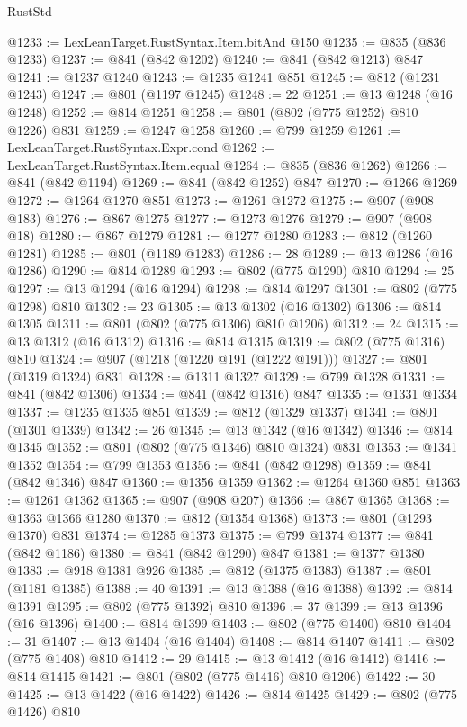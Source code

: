 \begin{lexlean}{RustStd}
\begin{coremodule}
@1233 := LexLeanTarget.RustSyntax.Item.bitAnd @150
@1235 := @835 (@836 @1233)
@1237 := @841 (@842 @1202)
@1240 := @841 (@842 @1213) @847
@1241 := @1237 @1240
@1243 := @1235 @1241 @851
@1245 := @812 (@1231 @1243)
@1247 := @801 (@1197 @1245)
@1248 := 22
@1251 := @13 @1248 (@16 @1248)
@1252 := @814 @1251
@1258 := @801 (@802 (@775 @1252) @810 @1226) @831
@1259 := @1247 @1258
@1260 := @799 @1259
@1261 := LexLeanTarget.RustSyntax.Expr.cond
@1262 := LexLeanTarget.RustSyntax.Item.equal
@1264 := @835 (@836 @1262)
@1266 := @841 (@842 @1194)
@1269 := @841 (@842 @1252) @847
@1270 := @1266 @1269
@1272 := @1264 @1270 @851
@1273 := @1261 @1272
@1275 := @907 (@908 @183)
@1276 := @867 @1275
@1277 := @1273 @1276
@1279 := @907 (@908 @18)
@1280 := @867 @1279
@1281 := @1277 @1280
@1283 := @812 (@1260 @1281)
@1285 := @801 (@1189 @1283)
@1286 := 28
@1289 := @13 @1286 (@16 @1286)
@1290 := @814 @1289
@1293 := @802 (@775 @1290) @810
@1294 := 25
@1297 := @13 @1294 (@16 @1294)
@1298 := @814 @1297
@1301 := @802 (@775 @1298) @810
@1302 := 23
@1305 := @13 @1302 (@16 @1302)
@1306 := @814 @1305
@1311 := @801 (@802 (@775 @1306) @810 @1206)
@1312 := 24
@1315 := @13 @1312 (@16 @1312)
@1316 := @814 @1315
@1319 := @802 (@775 @1316) @810
@1324 := @907 (@1218 (@1220 @191 (@1222 @191)))
@1327 := @801 (@1319 @1324) @831
@1328 := @1311 @1327
@1329 := @799 @1328
@1331 := @841 (@842 @1306)
@1334 := @841 (@842 @1316) @847
@1335 := @1331 @1334
@1337 := @1235 @1335 @851
@1339 := @812 (@1329 @1337)
@1341 := @801 (@1301 @1339)
@1342 := 26
@1345 := @13 @1342 (@16 @1342)
@1346 := @814 @1345
@1352 := @801 (@802 (@775 @1346) @810 @1324) @831
@1353 := @1341 @1352
@1354 := @799 @1353
@1356 := @841 (@842 @1298)
@1359 := @841 (@842 @1346) @847
@1360 := @1356 @1359
@1362 := @1264 @1360 @851
@1363 := @1261 @1362
@1365 := @907 (@908 @207)
@1366 := @867 @1365
@1368 := @1363 @1366 @1280
@1370 := @812 (@1354 @1368)
@1373 := @801 (@1293 @1370) @831
@1374 := @1285 @1373
@1375 := @799 @1374
@1377 := @841 (@842 @1186)
@1380 := @841 (@842 @1290) @847
@1381 := @1377 @1380
@1383 := @918 @1381 @926
@1385 := @812 (@1375 @1383)
@1387 := @801 (@1181 @1385)
@1388 := 40
@1391 := @13 @1388 (@16 @1388)
@1392 := @814 @1391
@1395 := @802 (@775 @1392) @810
@1396 := 37
@1399 := @13 @1396 (@16 @1396)
@1400 := @814 @1399
@1403 := @802 (@775 @1400) @810
@1404 := 31
@1407 := @13 @1404 (@16 @1404)
@1408 := @814 @1407
@1411 := @802 (@775 @1408) @810
@1412 := 29
@1415 := @13 @1412 (@16 @1412)
@1416 := @814 @1415
@1421 := @801 (@802 (@775 @1416) @810 @1206)
@1422 := 30
@1425 := @13 @1422 (@16 @1422)
@1426 := @814 @1425
@1429 := @802 (@775 @1426) @810

\end{coremodule}
\end{lexlean}
